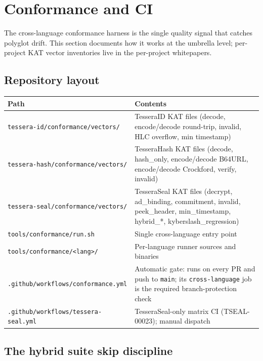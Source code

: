 \section{Conformance and CI}
\label{sec:conformance}

The cross-language conformance harness is the single quality signal that catches polyglot drift. This section documents how it works at the umbrella level; per-project KAT vector inventories live in the per-project whitepapers.

\subsection{Repository layout}

\begin{center}
\small
\begin{tabularx}{\textwidth}{@{}lX@{}}
\toprule
\textbf{Path} & \textbf{Contents} \\
\midrule
\texttt{tessera-id/conformance/vectors/}     & TesseraID KAT files (decode, encode/decode round-trip, invalid, HLC overflow, min timestamp) \\
\texttt{tessera-hash/conformance/vectors/}   & TesseraHash KAT files (decode, hash\_only, encode/decode B64URL, encode/decode Crockford, verify, invalid) \\
\texttt{tessera-seal/conformance/vectors/}  & TesseraSeal KAT files (decrypt, ad\_binding, commitment, invalid, peek\_header, min\_timestamp, hybrid\_*, kyberslash\_regression) \\
\texttt{tools/conformance/run.sh}      & Single cross-language entry point \\
\texttt{tools/conformance/<lang>/}     & Per-language runner sources and binaries \\
\texttt{.github/workflows/conformance.yml} & Automatic gate: runs on every PR and push to \texttt{main}; its \texttt{cross-language} job is the required branch-protection check \\
\texttt{.github/workflows/tessera-seal.yml}     & TesseraSeal-only matrix CI (TSEAL-00023); manual dispatch \\
\bottomrule
\end{tabularx}
\end{center}

\subsection{The hybrid suite \texorpdfstring{}{0x06} skip discipline}

